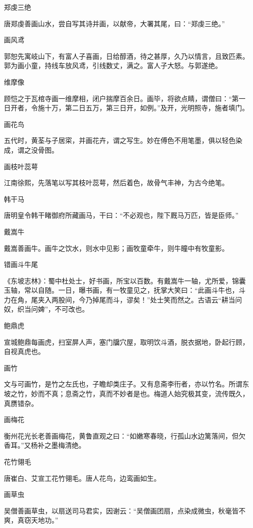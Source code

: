 \documentclass[a4paper,12pt,UTF8,twoside]{ctexbook}
\begin{document}
    郑虔三绝
    
    唐郑虔善画山水，尝自写其诗并画，以献帝，大署其尾，曰：“郑虔三绝。”
    
    画风鸢
    
    郭恕先寓岐山下，有富人子喜画，日给醇酒，待之甚厚，久乃以情言，且致匹素。郭为画小童，持线车放风鸢，引线数丈，满之。富人子大怒。与郭遂绝。
    
    维摩像
    
    顾恺之于瓦棺寺画一维摩相，闭户揣摩百余日。画毕，将欲点睛，谓僧曰：“第一日开者，令施十万，第二日五万，第三日开，如例。”及开，光明照寺，施者填门。
    
    画花鸟
    
    五代时，黄荃与子居寀，并画花卉，谓之写生。妙在傅色不用笔墨，俱以轻色染成，谓之没骨图。
    
    画枝叶蕊萼
    
    江南徐熙，先落笔以写其枝叶蕊萼，然后着色，故骨气丰神，为古今绝笔。
    
    韩干马
    
    唐明皇令韩干睹御府所藏画马，干曰：“不必观也，陛下厩马万匹，皆是臣师。”
    
    戴嵩牛
    
    戴嵩善画牛。画牛之饮水，则水中见影；画牧童牵牛，则牛瞳中有牧童影。
    
    错画斗牛尾
    
    《东坡志林》：蜀中杜处士，好书画，所宝以百数。有戴嵩牛一轴，尤所爱，锦囊玉轴，常以自随。一日，曝书画，有一牧童见之，抚掌大笑曰：“此画斗牛也，斗力在角，尾夹入两股间，今乃掉尾而斗，谬矣！”处士笑而然之。古语云“耕当问奴，织当问婢”，不可改也。
    
    鲍鼎虎
    
    宣城鲍鼎每画虎，扫室屏人声，塞门牖穴屋，取明饮斗酒，脱衣据地，卧起行顾，自视真虎也。
    
    画竹
    
    文与可画竹，是竹之左氏也，子瞻却类庄子。又有息斋李衎者，亦以竹名。所谓东坡之竹，妙而不真；息斋之竹，真而不妙者是也。梅道人始究极其变，流传既久，真赝错杂。
    
    画梅花
    
    衡州花光长老善画梅花，黄鲁直观之曰：“如嫩寒春晓，行孤山水边篱落间，但欠香耳。”又杨补之墨梅清绝。
    
    花竹翎毛
    
    唐崔白、艾宣工花竹翎毛。唐人花鸟，边鸾画如生。
    
    画草虫
    
    吴僧善画草虫，以扇送司马君实，因谢云：“吴僧画团扇，点染成微虫，秋毫皆不爽，真窃天地功。”
    
\end{document}
